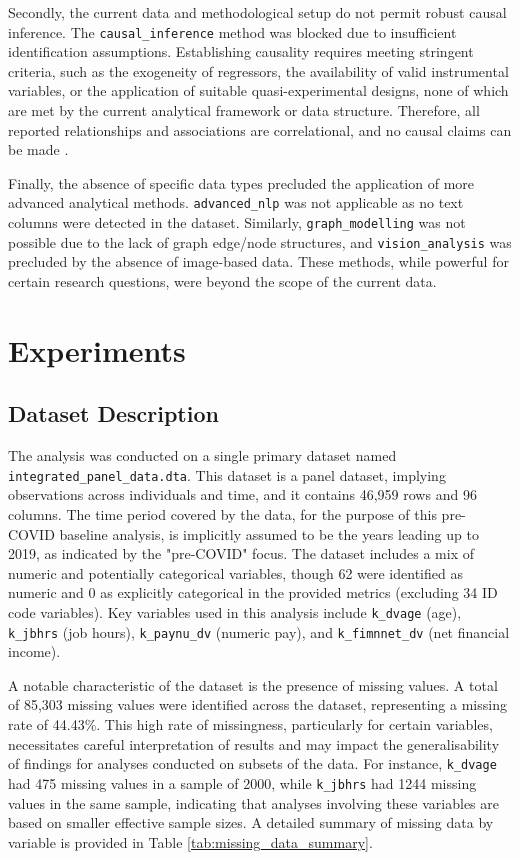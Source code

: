 \documentclass[11pt,a4paper]{article}
\begin{document}
Secondly, the current data and methodological setup do not permit robust causal inference. The \texttt{causal\_inference} method was blocked due to insufficient identification assumptions. Establishing causality requires meeting stringent criteria, such as the exogeneity of regressors, the availability of valid instrumental variables, or the application of suitable quasi-experimental designs, none of which are met by the current analytical framework or data structure. Therefore, all reported relationships and associations are correlational, and no causal claims can be made \cite{ref2}.

Finally, the absence of specific data types precluded the application of more advanced analytical methods. \texttt{advanced\_nlp} was not applicable as no text columns were detected in the dataset. Similarly, \texttt{graph\_modelling} was not possible due to the lack of graph edge/node structures, and \texttt{vision\_analysis} was precluded by the absence of image-based data. These methods, while powerful for certain research questions, were beyond the scope of the current data.

\section{Experiments}

\subsection{Dataset Description}

The analysis was conducted on a single primary dataset named \texttt{integrated\_panel\_data.dta}. This dataset is a panel dataset, implying observations across individuals and time, and it contains 46,959 rows and 96 columns. The time period covered by the data, for the purpose of this pre-COVID baseline analysis, is implicitly assumed to be the years leading up to 2019, as indicated by the "pre-COVID" focus. The dataset includes a mix of numeric and potentially categorical variables, though 62 were identified as numeric and 0 as explicitly categorical in the provided metrics (excluding 34 ID code variables). Key variables used in this analysis include \texttt{k\_dvage} (age), \texttt{k\_jbhrs} (job hours), \texttt{k\_paynu\_dv} (numeric pay), and \texttt{k\_fimnnet\_dv} (net financial income).

A notable characteristic of the dataset is the presence of missing values. A total of 85,303 missing values were identified across the dataset, representing a missing rate of 44.43\%. This high rate of missingness, particularly for certain variables, necessitates careful interpretation of results and may impact the generalisability of findings for analyses conducted on subsets of the data. For instance, \texttt{k\_dvage} had 475 missing values in a sample of 2000, while \texttt{k\_jbhrs} had 1244 missing values in the same sample, indicating that analyses involving these variables are based on smaller effective sample sizes. A detailed summary of missing data by variable is provided in Table \ref{tab:missing_data_summary}.
\end{document}
